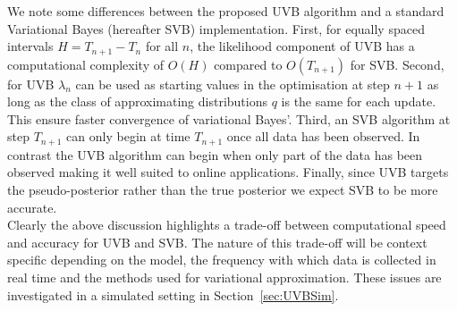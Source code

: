 \documentclass[12pt,a4paper]{article}\usepackage[]{graphicx}\usepackage[]{color}
\begin{document}
{We note some differences between the proposed UVB algorithm and a standard Variational Bayes (hereafter SVB) implementation.  First, for equally spaced intervals $H=T_{n+1}-T_{n}$ for all $n$, the likelihood component of UVB has a computational complexity of $O(H)$ compared to $O(T_{n+1})$ for SVB.  Second, for UVB $\lambda_n$ can be used as starting values in the optimisation at step $n+1$ as long as the class of approximating distributions $q$ is the same for each update.  This ensure faster convergence of variational Bayes'.  Third, an SVB algorithm at step $T_{n+1}$ can only begin at time $T_{n+1}$ once all data has been observed.  In contrast the UVB algorithm can begin when only part of the data has been observed making it well suited to online applications.  Finally, since UVB targets the pseudo-posterior rather than the true posterior we expect SVB to be more accurate.
\\

Clearly the above discussion highlights a trade-off between computational speed and accuracy for UVB and SVB.  The nature of this trade-off will be context specific depending on the model, the frequency with which data is collected in real time and the methods used for variational approximation.  These issues are investigated in a simulated setting in Section~\ref{sec:UVBSim}.}
\end{document}
